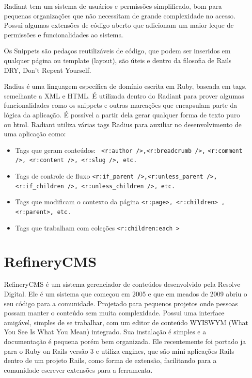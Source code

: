 Radiant tem um sistema de usuários e permissões simplificado, bom para pequenas organizações que não necessitam de grande complexidade no acesso. Possui algumas extensões de código aberto que adicionam um maior leque de permissões e funcionalidades ao sistema.

Os Snippets são pedaços reutilizáveis de código, que podem ser inseridos em qualquer página ou template (layout), são úteis e dentro da filosofia de Rails DRY, Don't Repeat Yourself. 

Radius é uma linguagem específica de domínio escrita em Ruby, baseada em tags, semelhante a XML e HTML. É utilizada dentro do Radiant para prover algumas funcionalidades como os snippets e outras marcações que encapsulam parte da lógica da aplicação. É possível a partir dela gerar qualquer forma de texto puro ou html. Radiant utiliza várias tags Radius para auxiliar no desenvolvimento de uma aplicação como:
\begin{itemize}
 \item Tags que geram conteúdos: \verb+ <r:author />,<r:breadcrumb />,+
  \verb+<r:comment />, <r:content />, <r:slug />, etc.+
  \item Tags de controle de fluxo \verb+<r:if_parent />,<r:unless_parent />,+
  \verb+<r:if_children />, <r:unless_children />, etc.+
  \item Tags que modificam o contexto da página \verb+<r:page>, <r:children> ,+ 
  \verb+<r:parent>, etc.+
  \item Tags que trabalham com coleções \verb+<r:children:each >+
\end{itemize}


\section{RefineryCMS}

RefineryCMS é um sistema gerenciador de conteúdos desenvolvido pela Resolve Digital. Ele é um sistema que começou em 2005 e que em meados de 2009 abriu o seu código para a comunidade. Projetado para pequenos projetos onde pessoas possam manter o conteúdo sem muita complexidade. Possui uma interface amigável, simples de se trabalhar, com um editor de conteúdo WYISWYM (What You See Is What You Mean) integrado. Sua instalação é simples e a documentação é pequena porém bem organizada. Ele recentemente foi portado ja para o Ruby on Rails versão 3 e utiliza engines, que são mini aplicações Rails dentro de um projeto Rails, como forma de extensão, facilitando para a comunidade escrever extensões para a ferramenta. 

